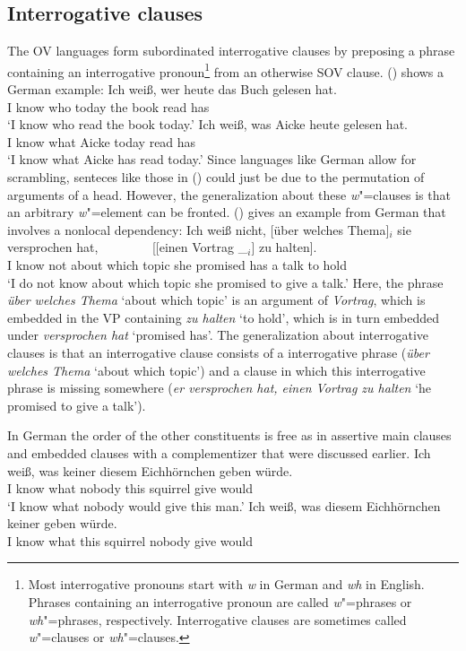 \subsection{Interrogative clauses}


The OV languages form subordinated interrogative clauses by preposing a phrase containing an
interrogative pronoun\footnote{
Most interrogative pronouns start with \emph{w} in German and \emph{wh} in English. Phrases
containing an interrogative pronoun are called \emph{w}"=phrases or \emph{wh}"=phrases,
respectively. Interrogative clauses are sometimes called \emph{w}"=clauses or \emph{wh}"=clauses.
} from an
otherwise SOV clause. () shows a German example:
\eal
\ex 
\gll Ich weiß, wer heute das Buch gelesen hat.\\
     I know    who today the book read has\\
\glt `I know who read the book today.'
\ex 
\gll Ich weiß, was Aicke heute gelesen hat.\\
     I know    what Aicke today read has\\
\glt `I know what Aicke has read today.'
\zl
Since languages like German allow for scrambling, senteces like those in () could just be due
to the permutation of arguments of a head. However, the generalization about these \emph{w}"=clauses
is that an arbitrary \emph{w}"=element can be fronted. () gives an example from German that
involves a nonlocal dependency:
\ea
\gll Ich weiß nicht, [über welches Thema]$_i$ sie versprochen hat,~~~~~~~~ [[einen Vortrag \_$_i$] zu halten].\\
     I know not      \spacebr about which topic she promised has \hphantom{[[}a talk to  hold\\
\glt `I do not know about which topic she promised to give a talk.'
\z
Here, the phrase \emph{über welches Thema} `about which topic' is an argument of \emph{Vortrag},
which is embedded in the VP containing \emph{zu halten} `to hold', which is in turn embedded under
\emph{versprochen hat} `promised has'. The generalization about interrogative clauses is that an
interrogative clause consists of a interrogative phrase (\emph{über welches Thema} `about which
topic') and a clause in which this interrogative phrase is missing somewhere (\emph{er versprochen
  hat, einen Vortrag zu halten} `he promised to give a talk').

In German the order of the other constituents is free as in assertive main clauses and embedded
clauses with a complementizer that were discussed earlier. 
\eal
\ex
\gll Ich weiß, was keiner diesem Eichhörnchen geben würde.\\
     I know    what nobody this squirrel give would\\
\glt `I know what nobody would give this man.'
\ex 
\gll Ich weiß, was diesem Eichhörnchen keiner geben würde.\\
     I know what this squirrel nobody give would\\
\zl

